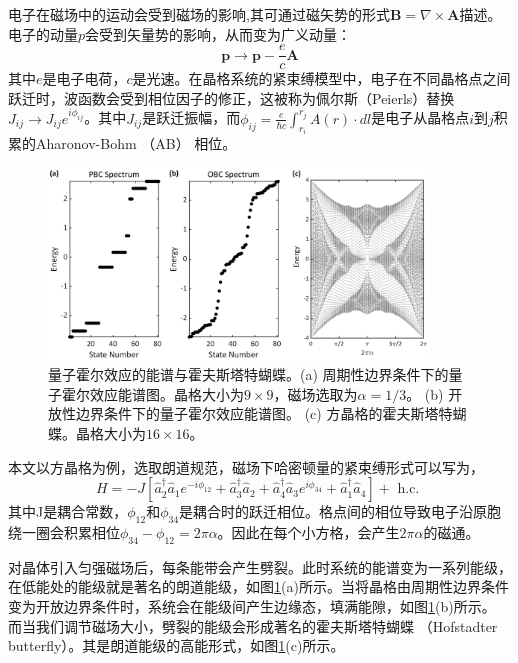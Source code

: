 电子在磁场中的运动会受到磁场的影响,其可通过磁矢势的形式$\mathbf{B}=\nabla\times \mathbf{A}$描述。电子的动量$p$会受到矢量势的影响，从而变为广义动量：
\begin{equation}
	\mathbf{p}\to \mathbf{p}-\frac{e}{c}\mathbf{A}
\end{equation}
其中$e$是电子电荷，$c$是光速。在晶格系统的紧束缚模型中，电子在不同晶格点之间跃迁时，波函数会受到相位因子的修正，这被称为佩尔斯（Peierls）替换$J_{ij}\to J_{ij}e^{i\phi_{ij}}$。其中$J_{ij}$是跃迁振幅，而$\phi_{ij}=\frac{e}{\hbar c}\int_{r_i}^{r_j} A(r) \cdot dl$是电子从晶格点$i$到$j$积累的Aharonov-Bohm （AB） 相位。

\begin{figure}[htbp]
	\centering
	\includegraphics[width=0.9\textwidth]{figure/Introduction/Hofstadter.png}
 \caption{量子霍尔效应的能谱与霍夫斯塔特蝴蝶。(a) 周期性边界条件下的量子霍尔效应能谱图。晶格大小为$9\times9$，磁场选取为$\alpha=1/3$。
(b) 开放性边界条件下的量子霍尔效应能谱图。
(c) 方晶格的霍夫斯塔特蝴蝶。晶格大小为$16\times16$。}
 \label{fig:Hofstadter}
\end{figure}

本文以方晶格为例，选取朗道规范，磁场下哈密顿量的紧束缚形式可以写为，
\begin{equation}
	H=-J\left[\hat{a}_2^{\dagger} \hat{a}_1 e^{-i \phi_{12}}+\hat{a}_3^{\dagger} \hat{a}_2+\hat{a}_4^{\dagger} \hat{a}_3 e^{i \phi_{34}}+\hat{a}_1^{\dagger} \hat{a}_4\right]+\text { h.c. }
\end{equation}
其中J是耦合常数，$\phi_{12}$和$\phi_{34}$是耦合时的跃迁相位。格点间的相位导致电子沿原胞绕一圈会积累相位$\phi_{34}-\phi_{12}=2\pi\alpha$。因此在每个小方格，会产生$2\pi\alpha$的磁通。

对晶体引入匀强磁场后，每条能带会产生劈裂。此时系统的能谱变为一系列能级，在低能处的能级就是著名的朗道能级，如图\ref{fig:Hofstadter}(a)所示。当将晶格由周期性边界条件变为开放边界条件时，系统会在能级间产生边缘态，填满能隙，如图\ref{fig:Hofstadter}(b)所示。
而当我们调节磁场大小，劈裂的能级会形成著名的霍夫斯塔特蝴蝶 （Hofstadter butterfly）。其是朗道能级的高能形式，如图\ref{fig:Hofstadter}(c)所示。

